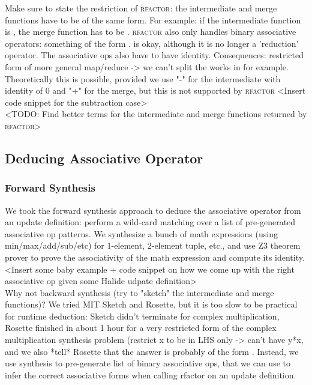 Make sure to state the restriction of \textsc{rfactor}: the intermediate and merge functions have to be of the same form. For example: if the intermediate function is , the merge function has to be . \textsc{rfactor} also only handles binary associative operators: something of the form .  is okay, although it is no longer a 'reduction' operator. The associative ops also have to have identity. Consequences: restricted form of more general map/reduce -> we can't split the works in  for example. Theoretically this is possible, provided we use "-" for the intermediate with identity of 0 and "+" for the merge, but this is not supported by \textsc{rfactor} <Insert code snippet for the subtraction case> \\

<TODO: Find better terms for the intermediate and merge functions returned by \textsc{rfactor}> \\

\subsection{Deducing Associative Operator}

\subsubsection{Forward Synthesis}

We took the forward synthesis approach to deduce the associative operator from an update definition: perform a wild-card matching over a list of pre-generated associative op patterns. We synthesize a bunch of math expressions (using min/max/add/sub/etc) for 1-element, 2-element tuple, etc., and use Z3 theorem prover \cite{DeMoura:2008:ZES:1792734.1792766} to prove the associativity of the math expression and compute its identity. \\

<Insert some baby example + code snippet on how we come up with the right associative op given some Halide udpate definition> \\

Why not backward synthesis (try to "sketch" the intermediate and merge functions)? We tried MIT Sketch and Rosette, but it is too slow to be practical for runtime deduction: Sketch didn't terminate for complex multiplication, Rosette finished in about 1 hour for a very restricted form of the complex multiplication synthesis problem (restrict x to be in LHS only -> can't have y*x, and we also *tell* Rosette that the answer is probably of the form . Instead, we use synthesis to pre-generate list of binary associative ops, that we can use to infer the correct associative forms when calling rfactor on an update definition. \\

